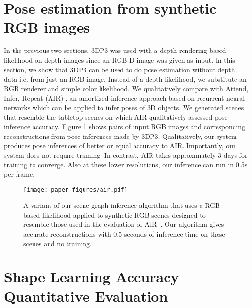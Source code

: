 \section{Pose estimation from synthetic RGB images}

In the previous two sections, 3DP3 was used with a depth-rendering-based likelihood on depth images since an RGB-D image was given as input. In this section, we show that 3DP3 can be used to do pose estimation without depth data i.e. from just an RGB image. Instead of a depth likelihood, we substitute an RGB renderer and simple color likelihood. We qualitatively compare with Attend, Infer, Repeat (AIR) \cite{eslami2016attend}, an amortized inference approach based on recurrent neural networks which can be applied to infer poses of 3D objects. We generated scenes that resemble the tabletop scenes on which AIR qualitatively assessed pose inference accuracy. Figure \ref{fig:air-comparison} shows pairs of input RGB images and corresponding reconstructions from pose inferences made by 3DP3. Qualitatively, our system produces pose inferences of better or equal accuracy to AIR. Importantly, our system does not require training. In contrast, AIR takes approximately 3 days for training to converge. Also at these lower resolutions, our inference can run in 0.5s per frame.
\begin{figure}[h!]
	\centering
	\texttt{[image: paper\_figures/air.pdf]}
	\caption{%
		A variant of our scene graph inference algorithm that uses a RGB-based likelihood applied to synthetic RGB scenes designed to resemble those used in the evaluation of AIR~\citep{eslami2016attend}.
		Our algorithm gives accurate reconstructions with 0.5 seconds of inference time on these scenes and no training.
	}
	\label{fig:air-comparison}
\end{figure}


\section{Shape Learning Accuracy Quantitative Evaluation}
\label{sec:shape_learning_quantitative_evaluation}

